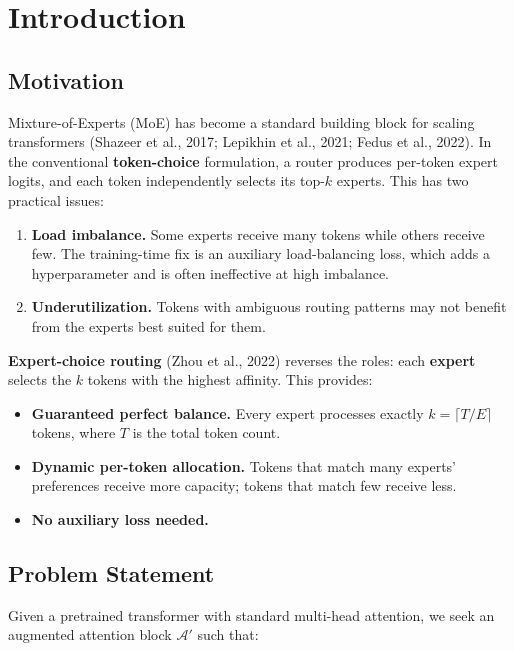 \section{Introduction}

\subsection{Motivation}

Mixture-of-Experts (MoE) has become a standard building block for scaling 
transformers (Shazeer et al., 2017; Lepikhin et al., 2021; Fedus et al., 
2022). In the conventional \textbf{token-choice} formulation, a router produces 
per-token expert logits, and each token independently selects its top-$k$ 
experts. This has two practical issues:

\begin{enumerate}
\item \textbf{Load imbalance.} Some experts receive many tokens while others receive
  few. The training-time fix is an auxiliary load-balancing loss, which
  adds a hyperparameter and is often ineffective at high imbalance.
\item \textbf{Underutilization.} Tokens with ambiguous routing patterns may not
  benefit from the experts best suited for them.

\end{enumerate}
\textbf{Expert-choice routing} (Zhou et al., 2022) reverses the roles: each 
\textbf{expert} selects the $k$ tokens with the highest affinity. This 
provides:

\begin{itemize}
\item \textbf{Guaranteed perfect balance.} Every expert processes exactly
  $k = \lceil T / E \rceil$ tokens, where $T$ is the total token count.
\item \textbf{Dynamic per-token allocation.} Tokens that match many experts'
  preferences receive more capacity; tokens that match few receive less.
\item \textbf{No auxiliary loss needed.}

\end{itemize}
\subsection{Problem Statement}

Given a pretrained transformer with standard multi-head attention, we seek 
an augmented attention block $\mathcal{A}'$ such that:


